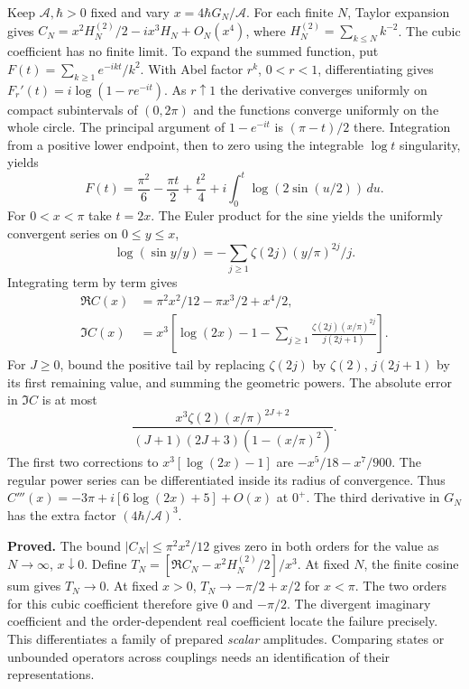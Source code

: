 \newpage
{}
Keep $\mathcal A,\hbar>0$ fixed and vary $x=4\hbar G_N/\mathcal A$. For each finite $N$, Taylor expansion gives $C_N=x^2 H_N^{(2)}/2-ix^3H_N+O_N(x^4)$, where $H_N^{(2)}=\sum_{k\le N}k^{-2}$. The cubic coefficient has no finite limit. To expand the summed function, put $F(t)=\sum_{k\ge1}e^{-ikt}/k^2$. With Abel factor $r^k$, $0<r<1$, differentiating gives $F_r'(t)=i\log(1-r e^{-it})$. As $r\uparrow1$ the derivative converges uniformly on compact subintervals of $(0,2\pi)$ and the functions converge uniformly on the whole circle. The principal argument of $1-e^{-it}$ is $(\pi-t)/2$ there. Integration from a positive lower endpoint, then to zero using the integrable $\log t$ singularity, yields
\[
 F(t)=\frac{\pi^2}{6}-\frac{\pi t}{2}+\frac{t^2}{4}
      +i\int_0^t\log(2\sin(u/2))\,du .
\]
For $0<x<\pi$ take $t=2x$. The Euler product for the sine yields the uniformly convergent series on $0\le y\le x$,
\[
 \log(\sin y/y)=-\sum_{j\ge1}\zeta(2j)(y/\pi)^{2j}/j .
\]
Integrating term by term gives
\begin{align*}
 \Re C(x)&=\pi^2x^2/12-\pi x^3/2+x^4/2,\\
 \Im C(x)&=x^3\left[\log(2x)-1-\sum_{j\ge1}
       \frac{\zeta(2j)(x/\pi)^{2j}}{j(2j+1)}\right].
\end{align*}
For $J\ge0$, bound the positive tail by replacing $\zeta(2j)$ by $\zeta(2)$, $j(2j+1)$ by its first remaining value, and summing the geometric powers. The absolute error in $\Im C$ is at most
\[
 \frac{x^3\zeta(2)(x/\pi)^{2J+2}}
 {(J+1)(2J+3)(1-(x/\pi)^2)}.
\]
The first two corrections to $x^3[\log(2x)-1]$ are $-x^5/18-x^7/900$. The regular power series can be differentiated inside its radius of convergence. Thus $C'''(x)=-3\pi+i[6\log(2x)+5]+O(x)$ at $0^+$. The third derivative in $G_N$ has the extra factor $(4\hbar/\mathcal A)^3$.

\textbf{Proved.} The bound $|C_N|\le\pi^2 x^2/12$ gives zero in both orders for the value as $N\to\infty$, $x\downarrow0$. Define
$T_N=[\Re C_N-x^2 H_N^{(2)}/2]/x^3$. At fixed $N$, the finite cosine sum gives $T_N\to0$. At fixed $x>0$, $T_N\to-\pi/2+x/2$ for $x<\pi$. The two orders for this cubic coefficient therefore give $0$ and $-\pi/2$. The divergent imaginary coefficient and the order-dependent real coefficient locate the failure precisely. This differentiates a family of prepared \emph{scalar} amplitudes. Comparing states or unbounded operators across couplings needs an identification of their representations.
